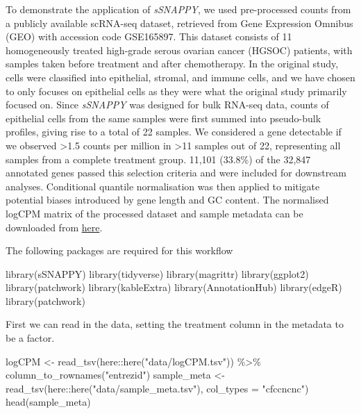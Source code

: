 \documentclass[9pt,a4paper,]{extarticle}
\newenvironment{Shaded}{\begin{snugshade}}{\end{snugshade}}
\newcommand{\AttributeTok}[1]{\textcolor[rgb]{0.77,0.63,0.00}{#1}}
\newcommand{\FunctionTok}[1]{\textcolor[rgb]{0.00,0.00,0.00}{#1}}
\newcommand{\NormalTok}[1]{#1}
\newcommand{\OtherTok}[1]{\textcolor[rgb]{0.56,0.35,0.01}{#1}}
\newcommand{\SpecialCharTok}[1]{\textcolor[rgb]{0.00,0.00,0.00}{#1}}
\newcommand{\StringTok}[1]{\textcolor[rgb]{0.31,0.60,0.02}{#1}}
\begin{document}
To demonstrate the application of \emph{sSNAPPY}, we used pre-processed counts from a publicly available scRNA-seq dataset, retrieved from Gene Expression Omnibus (GEO) with accession code GSE165897.
This dataset consists of 11 homogeneously treated high-grade serous ovarian cancer (HGSOC) patients, with samples taken before treatment and after chemotherapy\citep{Zhang2022}.
In the original study, cells were classified into epithelial, stromal, and immune cells, and we have chosen to only focuses on epithelial cells as they were what the original study primarily focused on.
Since \emph{sSNAPPY} was designed for bulk RNA-seq data, counts of epithelial cells from the same samples were first summed into pseudo-bulk profiles, giving rise to a total of 22 samples.
We considered a gene detectable if we observed \textgreater1.5 counts per million in \textgreater11 samples out of 22, representing all samples from a complete treatment group.
11,101 (33.8\%) of the 32,847 annotated genes passed this selection criteria and were included for downstream analyses.
Conditional quantile normalisation\citep{Hansen2012} was then applied to mitigate potential biases introduced by gene length and GC content.
The normalised logCPM matrix of the processed dataset and sample metadata can be downloaded from \href{https://github.com/Wenjun-Liu/F1000_sSNAPPY_manuscript/tree/master/data}{here}.

The following packages are required for this workflow

\begin{Shaded}
\begin{Highlighting}[]
\FunctionTok{library}\NormalTok{(sSNAPPY)}
\FunctionTok{library}\NormalTok{(tidyverse)}
\FunctionTok{library}\NormalTok{(magrittr)}
\FunctionTok{library}\NormalTok{(ggplot2)}
\FunctionTok{library}\NormalTok{(patchwork)}
\FunctionTok{library}\NormalTok{(kableExtra)}
\FunctionTok{library}\NormalTok{(AnnotationHub) }
\FunctionTok{library}\NormalTok{(edgeR)}
\FunctionTok{library}\NormalTok{(patchwork)}
\end{Highlighting}
\end{Shaded}

First we can read in the data, setting the treatment column in the metadata to be a factor.

\begin{Shaded}
\begin{Highlighting}[]
\NormalTok{logCPM }\OtherTok{\textless{}{-}} \FunctionTok{read\_tsv}\NormalTok{(here}\SpecialCharTok{::}\FunctionTok{here}\NormalTok{(}\StringTok{"data/logCPM.tsv"}\NormalTok{)) }\SpecialCharTok{\%\textgreater{}\%}
    \FunctionTok{column\_to\_rownames}\NormalTok{(}\StringTok{"entrezid"}\NormalTok{)}
\NormalTok{sample\_meta }\OtherTok{\textless{}{-}} \FunctionTok{read\_tsv}\NormalTok{(here}\SpecialCharTok{::}\FunctionTok{here}\NormalTok{(}\StringTok{"data/sample\_meta.tsv"}\NormalTok{), }\AttributeTok{col\_types =} \StringTok{"cfccncnc"}\NormalTok{)}
\FunctionTok{head}\NormalTok{(sample\_meta)}
\end{Highlighting}
\end{Shaded}
\end{document}
